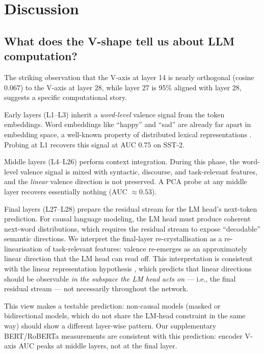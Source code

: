 \section{Discussion}
\label{sec:discussion}

\subsection{What does the V-shape tell us about LLM computation?}

The striking observation that the V-axis at layer 14 is nearly orthogonal
(cosine $0.067$) to the V-axis at layer 28, while layer 27 is 95\% aligned
with layer 28, suggests a specific computational story.

Early layers (L1--L3) inherit a \emph{word-level} valence signal from the
token embeddings. Word embeddings like ``happy'' and ``sad'' are already
far apart in embedding space, a well-known property of distributed lexical
representations \cite{mikolov2013linguistic, bolukbasi2016man}. Probing at
L1 recovers this signal at AUC $0.75$ on SST-2.

Middle layers (L4--L26) perform context integration. During this phase, the
word-level valence signal is mixed with syntactic, discourse, and task-relevant
features, and the \emph{linear} valence direction is not preserved. A PCA
probe at any middle layer recovers essentially nothing (AUC $\approx 0.53$).

Final layers (L27--L28) prepare the residual stream for the LM head's
next-token prediction. For causal language modeling, the LM head must
produce coherent next-word distributions, which requires the residual stream
to expose ``decodable'' semantic directions. We interpret the final-layer
re-crystallisation as a re-linearisation of task-relevant features: valence
re-emerges as an approximately linear direction that the LM head can read
off. This interpretation is consistent with the linear representation
hypothesis \cite{park2024linear}, which predicts that linear directions
should be observable \emph{in the subspace the LM head acts on} --- i.e.,
the final residual stream --- not necessarily throughout the network.

This view makes a testable prediction: non-causal models
(masked or bidirectional models, which do not share the LM-head constraint
in the same way) should show a different layer-wise pattern. Our
supplementary BERT/RoBERTa measurements are consistent with this
prediction: encoder V-axis AUC peaks at middle layers, not at the final
layer.

